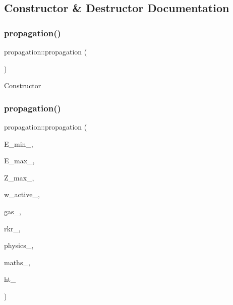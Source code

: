 \subsection{Constructor \& Destructor Documentation}
\mbox{\label{classpropagation_a9d7b9f42ce1c0bc741d3016a07ba13f7}} 
\subsubsection{\texorpdfstring{propagation()}{propagation()}\hspace{0.1cm}{\footnotesize\ttfamily [1/2]}}
{\footnotesize\ttfamily propagation\+::propagation (\begin{DoxyParamCaption}{ }\end{DoxyParamCaption})}

Constructor \mbox{\label{classpropagation_a082efa11767639ade0eaf0f8856cc410}} 
\subsubsection{\texorpdfstring{propagation()}{propagation()}\hspace{0.1cm}{\footnotesize\ttfamily [2/2]}}
{\footnotesize\ttfamily propagation\+::propagation (\begin{DoxyParamCaption}\item[{double}]{E\+\_\+min\+\_\+,  }\item[{double}]{E\+\_\+max\+\_\+,  }\item[{double}]{Z\+\_\+max\+\_\+,  }\item[{Eigen\+::\+Array\+Xd}]{w\+\_\+active\+\_\+,  }\item[{\hyperlink{classkeldysh__gas}{keldysh\+\_\+gas} \&}]{gas\+\_\+,  }\item[{grid\+\_\+rkr \&}]{rkr\+\_\+,  }\item[{\hyperlink{classphysics__textbook}{physics\+\_\+textbook} \&}]{physics\+\_\+,  }\item[{\hyperlink{classmaths__textbook}{maths\+\_\+textbook} \&}]{maths\+\_\+,  }\item[{D\+HT \&}]{ht\+\_\+ }\end{DoxyParamCaption})}



